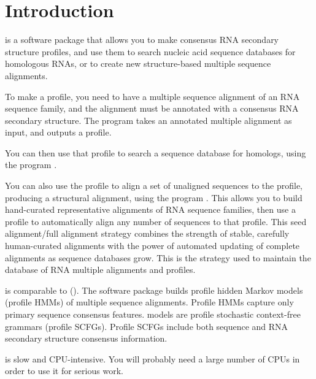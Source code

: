 \section{Introduction}

 is a software package that allows you to make
consensus RNA secondary structure profiles, and use them to search
nucleic acid sequence databases for homologous RNAs, or to create new
structure-based multiple sequence alignments.

To make a profile, you need to have a multiple sequence alignment of
an RNA sequence family, and the alignment must be annotated with a
consensus RNA secondary structure. The program  takes an
annotated multiple alignment as input, and outputs a profile.

You can then use that profile to search a sequence database for homologs,
using the program .

You can also use the profile to align a set of unaligned sequences to
the profile, producing a structural alignment, using the program
. This allows you to build hand-curated representative
alignments of RNA sequence families, then use a profile to
automatically align any number of sequences to that profile.  This
seed alignment/full alignment strategy combines the strength of
stable, carefully human-curated alignments with the power of automated
updating of complete alignments as sequence databases grow. This is
the strategy used to maintain the  database of RNA
multiple alignments and profiles.

 is comparable to 
().
The  software package builds profile hidden Markov
models (profile HMMs) of multiple sequence alignments. Profile HMMs
capture only primary sequence consensus features. 
models are profile stochastic context-free grammars (profile SCFGs).
Profile SCFGs include both sequence and RNA secondary structure
consensus information.

 is slow and CPU-intensive. You will probably need
a large number of CPUs in order to use it for serious work. 














